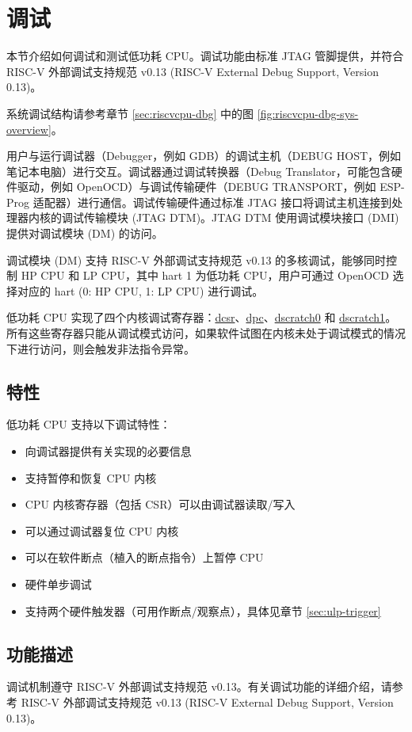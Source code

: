 \documentclass[main\_\_CN.tex]{subfiles}
\begin{document}
\section{调试}

本节介绍如何调试和测试低功耗 CPU。调试功能由标准 JTAG 管脚提供，并符合 RISC-V 外部调试支持规范 v0.13 (RISC-V External Debug Support, Version 0.13)。

\chipname{} 系统调试结构请参考章节 \ref{sec:riscvcpu-dbg} \textit{} 中的图 \ref{fig:riscvcpu-dbg-sys-overview}。

用户与运行调试器（Debugger，例如 GDB）的调试主机（DEBUG HOST，例如笔记本电脑）进行交互。调试器通过调试转换器（Debug Translator，可能包含硬件驱动，例如 OpenOCD）与调试传输硬件（DEBUG TRANSPORT，例如 ESP-Prog 适配器）进行通信。调试传输硬件通过标准 JTAG 接口将调试主机连接到处理器内核的调试传输模块 (JTAG DTM)。JTAG DTM 使用调试模块接口 (DMI) 提供对调试模块 (DM) 的访问。

调试模块 (DM) 支持 RISC-V 外部调试支持规范 v0.13 的多核调试，能够同时控制 HP CPU 和 LP CPU，其中 hart 1 为低功耗 CPU，用户可通过 OpenOCD 选择对应的 hart (0: HP CPU, 1: LP CPU) 进行调试。


低功耗 CPU 实现了四个内核调试寄存器：\hyperref[regdesc:LPDCSR]{dcsr}、\hyperref[regdesc:LPDPC]{dpc}、\hyperref[regdesc:LPDSCRATCH0]{dscratch0} 和 \hyperref[regdesc:LPDSCRATCH1]{dscratch1}。所有这些寄存器只能从调试模式访问，如果软件试图在内核未处于调试模式的情况下进行访问，则会触发非法指令异常。

\subsection{特性}
低功耗 CPU 支持以下调试特性：
\begin{itemize}
    \item {向调试器提供有关实现的必要信息}
    \item {支持暂停和恢复 CPU 内核}
    \item {CPU 内核寄存器（包括 CSR）可以由调试器读取/写入}
    \item {可以通过调试器复位 CPU 内核}
    \item {可以在软件断点（植入的断点指令）上暂停 CPU}
    \item {硬件单步调试}
    \item {支持两个硬件触发器（可用作断点/观察点），具体见章节 \ref{sec:ulp-trigger}}
\end{itemize}

\subsection{功能描述}
调试机制遵守 RISC-V 外部调试支持规范 v0.13。有关调试功能的详细介绍，请参考 RISC-V 外部调试支持规范 v0.13 (RISC-V External Debug Support, Version 0.13)。
\end{document}
